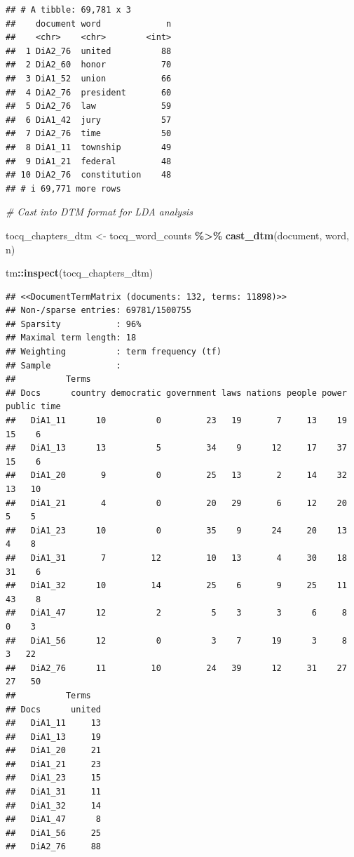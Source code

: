 \documentclass[
]{article}
\newenvironment{Shaded}{\begin{snugshade}}{\end{snugshade}}
\newcommand{\CommentTok}[1]{\textcolor[rgb]{0.56,0.35,0.01}{\textit{#1}}}
\newcommand{\FunctionTok}[1]{\textcolor[rgb]{0.13,0.29,0.53}{\textbf{#1}}}
\newcommand{\NormalTok}[1]{#1}
\newcommand{\OtherTok}[1]{\textcolor[rgb]{0.56,0.35,0.01}{#1}}
\newcommand{\SpecialCharTok}[1]{\textcolor[rgb]{0.81,0.36,0.00}{\textbf{#1}}}
\begin{document}
\begin{verbatim}
## # A tibble: 69,781 x 3
##    document word             n
##    <chr>    <chr>        <int>
##  1 DiA2_76  united          88
##  2 DiA2_60  honor           70
##  3 DiA1_52  union           66
##  4 DiA2_76  president       60
##  5 DiA2_76  law             59
##  6 DiA1_42  jury            57
##  7 DiA2_76  time            50
##  8 DiA1_11  township        49
##  9 DiA1_21  federal         48
## 10 DiA2_76  constitution    48
## # i 69,771 more rows
\end{verbatim}

\begin{Shaded}
\begin{Highlighting}[]
\CommentTok{\# Cast into DTM format for LDA analysis}

\NormalTok{tocq\_chapters\_dtm }\OtherTok{\textless{}{-}}\NormalTok{ tocq\_word\_counts }\SpecialCharTok{\%\textgreater{}\%}
  \FunctionTok{cast\_dtm}\NormalTok{(document, word, n)}

\NormalTok{tm}\SpecialCharTok{::}\FunctionTok{inspect}\NormalTok{(tocq\_chapters\_dtm)}
\end{Highlighting}
\end{Shaded}

\begin{verbatim}
## <<DocumentTermMatrix (documents: 132, terms: 11898)>>
## Non-/sparse entries: 69781/1500755
## Sparsity           : 96%
## Maximal term length: 18
## Weighting          : term frequency (tf)
## Sample             :
##          Terms
## Docs      country democratic government laws nations people power public time
##   DiA1_11      10          0         23   19       7     13    19     15    6
##   DiA1_13      13          5         34    9      12     17    37     15    6
##   DiA1_20       9          0         25   13       2     14    32     13   10
##   DiA1_21       4          0         20   29       6     12    20      5    5
##   DiA1_23      10          0         35    9      24     20    13      4    8
##   DiA1_31       7         12         10   13       4     30    18     31    6
##   DiA1_32      10         14         25    6       9     25    11     43    8
##   DiA1_47      12          2          5    3       3      6     8      0    3
##   DiA1_56      12          0          3    7      19      3     8      3   22
##   DiA2_76      11         10         24   39      12     31    27     27   50
##          Terms
## Docs      united
##   DiA1_11     13
##   DiA1_13     19
##   DiA1_20     21
##   DiA1_21     23
##   DiA1_23     15
##   DiA1_31     11
##   DiA1_32     14
##   DiA1_47      8
##   DiA1_56     25
##   DiA2_76     88
\end{verbatim}
\end{document}
